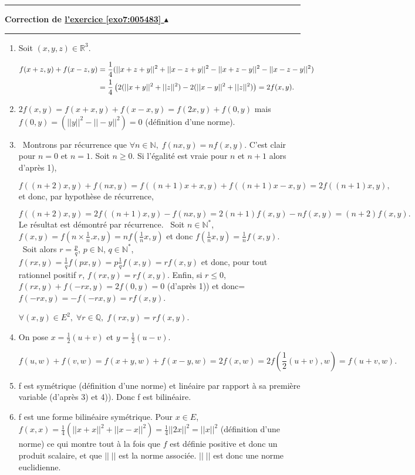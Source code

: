 \documentclass[11pt,a4paper]{article}
\newcommand{\Nn}{\mathbb{N}} \newcommand{\N}{\mathbb{N}}
\newcommand{\Qq}{\mathbb{Q}} \newcommand{\Q}{\mathbb{Q}}
\newcommand{\Rr}{\mathbb{R}} \newcommand{\R}{\mathbb{R}}
\newcounter{exo}
\newcommand{\correction}[1]{\hypertarget{cor7:#1}{}\label{cor7:#1}{\bf Correction de \hyperlink{exo7:#1}{l'exercice \ref{exo7:#1} $\blacktriangle$}}\vspace{1mm}\hrule\vspace{1mm}}
\newcommand{\fincorrection}{\vspace{1mm}\hrule\vspace*{7mm}}
\begin{document}
\begin{center}
\shadowbox{
$\forall(A,B)\in(\mathcal{M}_n(\Rr))^2,\;N(AB)\leq N(A)N(B)$.
}
\end{center}
\fincorrection
\correction{005483}
\begin{enumerate}
 \item  Soit $(x,y,z)\in\Rr^3$.

\begin{align*}\ensuremath f(x+z,y)+f(x-z,y)&=\frac{1}{4}(||x+z+y||^2+||x-z+y||^2-||x+z-y||^2-||x-z-y||^2)\\
 &=\frac{1}{4}\left(2(||x+y||^2+||z||^2)-2(||x-y||^2+||z||^2)\right)=2f(x,y).
\end{align*}
 \item  $2f(x,y)= f(x+x,y)+f(x-x,y)=f(2x,y)+f(0,y)$ mais $f(0,y)=(||y||^2-||-y||^2)=0$ (définition d'une norme).
 \item  \textbullet~Montrons par récurrence que $\forall n\in\Nn,\;f(nx,y)=nf(x,y)$.
C'est clair pour $n=0$ et $n=1$.
Soit $n\geq0$. Si l'égalité est vraie pour $n$ et $n+1$ alors d'après 1), 

$$f((n+2)x,y)+f(nx,y)=f((n+1)x+x,y)+f((n+1)x-x,y)=2f((n+1)x,y),$$
et donc, par hypothèse de récurrence,

$$f((n+2)x,y)=2f((n+1)x,y)-f(nx,y)=2(n+1)f(x,y)-nf(x,y)=(n+2)f(x,y).$$
Le résultat est démontré par récurrence.
\textbullet~Soit $n\in\Nn^*$, $f(x,y)=f\left(n\times\frac{1}{n}.x,y\right)=nf\left(\frac{1}{n}x,y\right)$ et donc $f\left(\frac{1}{n}x,y\right)=\frac{1}{n}f(x,y)$.
\textbullet~Soit alors $r=\frac{p}{q}$, $p\in\Nn$, $q\in\Nn^*$, $f(rx,y)=\frac{1}{q}f(px,y)=p\frac{1}{q}f(x,y)=rf(x,y)$ et donc, pour tout rationnel positif $r$, $f(rx,y)=rf(x,y)$.
Enfin, si $r\leq0$, $f(rx,y)+f(-rx,y)=2f(0,y)=0$ (d'après 1)) et donc= $f(-rx,y)=-f(-rx,y)=rf(x,y)$.

\begin{center}
$\forall(x,y)\in E^2,\;\forall r\in\Qq,\;f(rx,y)=rf(x,y)$.
\end{center}
 \item  On pose $x=\frac{1}{2}(u+v)$ et $y=\frac{1}{2}(u-v)$.

$$f(u,w)+f(v,w)=f(x+y,w)+f(x-y,w)=2f(x,w)=2f\left(\frac{1}{2}(u+v),w\right)=f(u+v,w).$$
 \item  f est symétrique (définition d'une norme) et linéaire par rapport à sa première variable (d'après 3) et 4)).
Donc f est bilinéaire.
 \item  f est une forme bilinéaire symétrique.
Pour $x\in E$, $f(x,x)=\frac{1}{4}(||x+x||^2+||x-x||^2)=\frac{1}{4}||2x||^2=||x||^2$ (définition d'une norme) ce qui montre tout à la fois que $f$ est définie positive et donc un produit scalaire, et que $||\;||$ est la norme associée. $||\;||$ est donc une norme euclidienne.
\end{enumerate}
\end{document}
